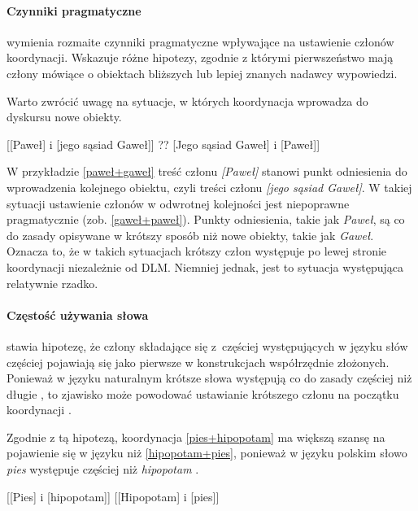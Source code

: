 \paragraph{Czynniki pragmatyczne} 

\cite{lohmann2014english} wymienia rozmaite czynniki pragmatyczne wpływające na ustawienie członów koordynacji. Wskazuje różne hipotezy, zgodnie z którymi pierwszeństwo mają człony mówiące o obiektach bliższych lub lepiej znanych nadawcy wypowiedzi. 

Warto zwrócić uwagę na sytuacje, w których koordynacja wprowadza do dyskursu nowe obiekty.

\begin{exe}
\ex \label{paweł+gaweł} {[[Paweł] i [jego sąsiad Gaweł]]}
\ex \label{gaweł+paweł} {?? [Jego sąsiad Gaweł] i [Paweł]]}
\end{exe}

W przykładzie \eqref{paweł+gaweł} treść członu \textit{[Paweł]} stanowi punkt odniesienia do wprowadzenia kolejnego obiektu, czyli treści członu \textit{[jego sąsiad Gaweł]}. W takiej sytuacji ustawienie członów w odwrotnej kolejności jest niepoprawne pragmatycznie (zob. \eqref{gaweł+paweł}). Punkty odniesienia, takie jak \textit{Paweł}, są co do zasady opisywane w krótszy sposób niż nowe obiekty, takie jak \textit{Gaweł}. Oznacza to, że w takich sytuacjach krótszy człon występuje po lewej stronie koordynacji niezależnie od DLM. Niemniej jednak, jest to sytuacja występująca relatywnie rzadko.

\paragraph{Częstość używania słowa}
\cite{fenk1989word} stawia hipotezę, że człony składające się z~częściej występujących w języku słów  częściej pojawiają się jako pierwsze w konstrukcjach współrzędnie złożonych. Ponieważ w języku naturalnym krótsze słowa występują co do zasady częściej niż długie \citep{zipf1946psychology}, to zjawisko może powodować ustawianie krótszego członu na początku koordynacji \citep[s. 54]{lohmann2014english}.

Zgodnie z tą hipotezą, koordynacja \eqref{pies+hipopotam} ma większą szansę na pojawienie się w języku niż \eqref{hipopotam+pies}, ponieważ w języku polskim słowo \textit{pies} występuje częściej niż \textit{hipopotam} \citep{lewandowska2012narodowy}.

\begin{exe}
\ex \label{pies+hipopotam} {[[Pies] i [hipopotam]]}
\ex \label{hipopotam+pies} {[[Hipopotam] i [pies]]}
\end{exe}


